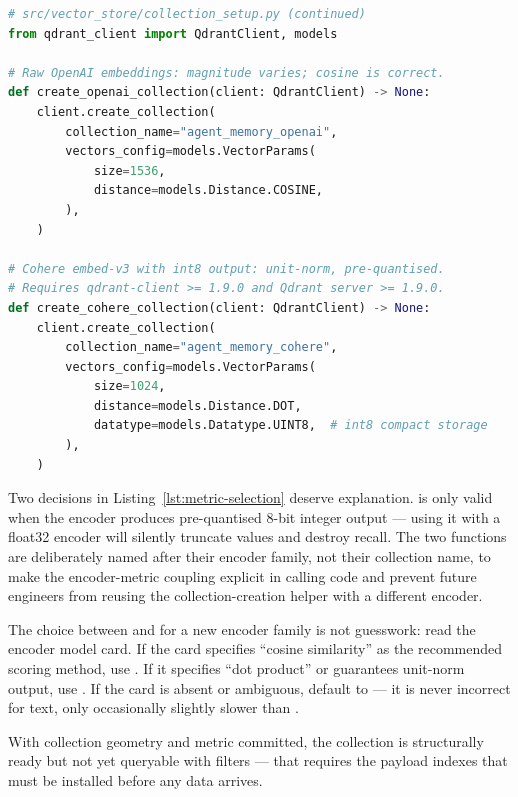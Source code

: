 \begin{lstlisting}[language=Python,
  caption={Metric selection at collection creation for two common encoder families},
  label={lst:metric-selection}]
# src/vector_store/collection_setup.py (continued)
from qdrant_client import QdrantClient, models

# Raw OpenAI embeddings: magnitude varies; cosine is correct.
def create_openai_collection(client: QdrantClient) -> None:
    client.create_collection(
        collection_name="agent_memory_openai",
        vectors_config=models.VectorParams(
            size=1536,
            distance=models.Distance.COSINE,
        ),
    )

# Cohere embed-v3 with int8 output: unit-norm, pre-quantised.
# Requires qdrant-client >= 1.9.0 and Qdrant server >= 1.9.0.
def create_cohere_collection(client: QdrantClient) -> None:
    client.create_collection(
        collection_name="agent_memory_cohere",
        vectors_config=models.VectorParams(
            size=1024,
            distance=models.Distance.DOT,
            datatype=models.Datatype.UINT8,  # int8 compact storage
        ),
    )
\end{lstlisting}

Two decisions in Listing~\ref{lst:metric-selection} deserve explanation.
 is only valid when the encoder produces
pre-quantised 8-bit integer output --- using it with a float32 encoder will
silently truncate values and destroy recall. The two functions are deliberately
named after their encoder family, not their collection name, to make the
encoder-metric coupling explicit in calling code and prevent future engineers
from reusing the collection-creation helper with a different encoder.

\begin{notebox}
The choice between  and  for a new encoder family is
not guesswork: read the encoder model card. If the card specifies ``cosine
similarity'' as the recommended scoring method, use . If it
specifies ``dot product'' or guarantees unit-norm output, use . If
the card is absent or ambiguous, default to  --- it is never
incorrect for text, only occasionally slightly slower than .
\end{notebox}

With collection geometry and metric committed, the collection is structurally
ready but not yet queryable with filters --- that requires the payload indexes
that must be installed before any data arrives.


